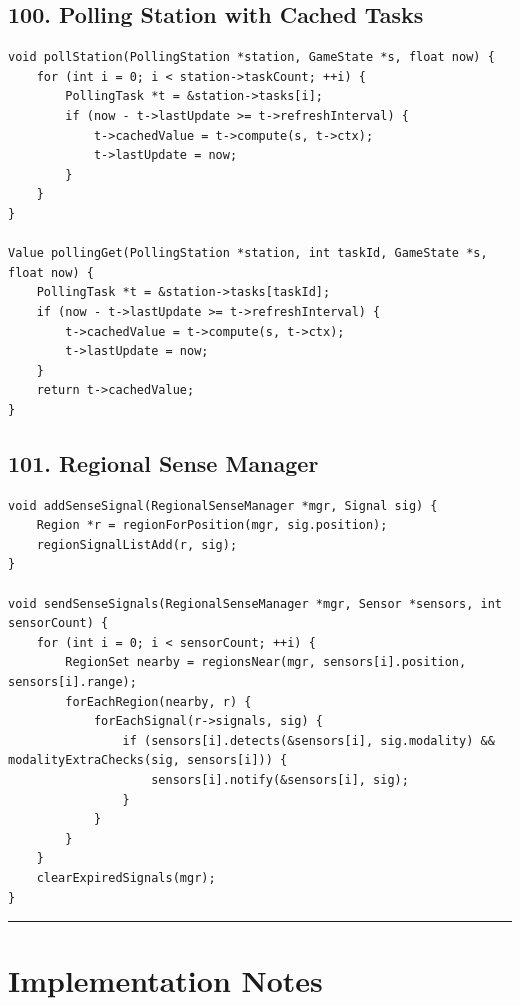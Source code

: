 \documentclass[10pt,letterpaper]{article}
\begin{document}
\subsection*{100. Polling Station with Cached Tasks}
{}

\begin{verbatim}
void pollStation(PollingStation *station, GameState *s, float now) {
    for (int i = 0; i < station->taskCount; ++i) {
        PollingTask *t = &station->tasks[i];
        if (now - t->lastUpdate >= t->refreshInterval) {
            t->cachedValue = t->compute(s, t->ctx);
            t->lastUpdate = now;
        }
    }
}

Value pollingGet(PollingStation *station, int taskId, GameState *s, float now) {
    PollingTask *t = &station->tasks[taskId];
    if (now - t->lastUpdate >= t->refreshInterval) {
        t->cachedValue = t->compute(s, t->ctx);
        t->lastUpdate = now;
    }
    return t->cachedValue;
}
\end{verbatim}

\subsection*{101. Regional Sense Manager}
{}

\begin{verbatim}
void addSenseSignal(RegionalSenseManager *mgr, Signal sig) {
    Region *r = regionForPosition(mgr, sig.position);
    regionSignalListAdd(r, sig);
}

void sendSenseSignals(RegionalSenseManager *mgr, Sensor *sensors, int sensorCount) {
    for (int i = 0; i < sensorCount; ++i) {
        RegionSet nearby = regionsNear(mgr, sensors[i].position, sensors[i].range);
        forEachRegion(nearby, r) {
            forEachSignal(r->signals, sig) {
                if (sensors[i].detects(&sensors[i], sig.modality) && modalityExtraChecks(sig, sensors[i])) {
                    sensors[i].notify(&sensors[i], sig);
                }
            }
        }
    }
    clearExpiredSignals(mgr);
}
\end{verbatim}

\medskip\hrule\medskip

\clearpage
\section*{Implementation Notes}
\end{document}
